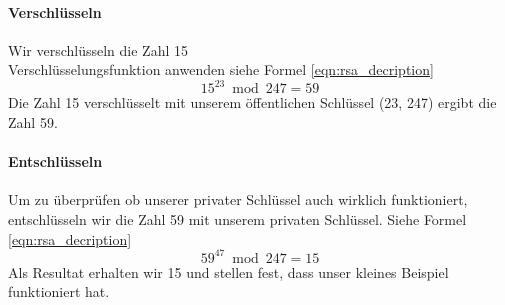 \paragraph{Verschlüsseln}
Wir verschlüsseln die Zahl 15\\
Verschlüsselungsfunktion anwenden siehe Formel \ref{eqn:rsa_decription}
\begin{equation*}
  15^{23} \bmod 247 = 59
\end{equation*}
Die Zahl 15 verschlüsselt mit unserem öffentlichen Schlüssel (23, 247) ergibt die Zahl 59.
%
\paragraph{Entschlüsseln}
Um zu überprüfen ob unserer privater Schlüssel auch wirklich funktioniert, entschlüsseln wir die Zahl 59 mit unserem privaten Schlüssel. Siehe Formel \ref{eqn:rsa_decription}\\
\begin{equation*}
  59^{47} \bmod 247 = 15
\end{equation*}
Als Resultat erhalten wir 15 und stellen fest, dass unser kleines Beispiel funktioniert hat.
%
%
